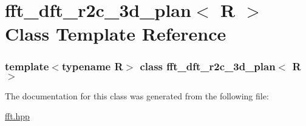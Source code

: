 \hypertarget{classfft__dft__r2c__3d__plan}{
\section{fft\_\-dft\_\-r2c\_\-3d\_\-plan$<$ R $>$ Class Template Reference}
\label{classfft__dft__r2c__3d__plan}
}
\subsubsection*{template$<$typename R$>$ class fft\_\-dft\_\-r2c\_\-3d\_\-plan$<$ R $>$}



The documentation for this class was generated from the following file:\begin{DoxyCompactItemize}
\item 
\hyperlink{fft_8hpp}{fft.hpp}\end{DoxyCompactItemize}
